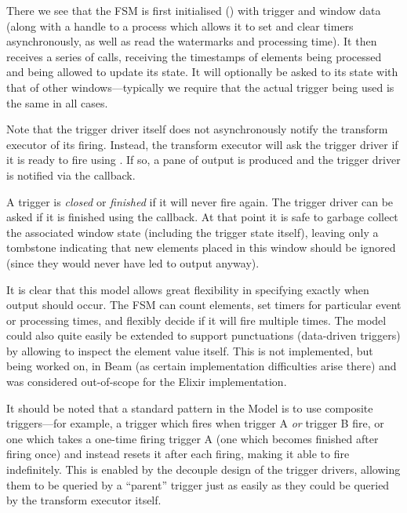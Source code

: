 
There we see that the FSM is first initialised () with trigger and window data (along with a handle to a process which allows it to set and clear timers asynchronously, as well as read the watermarks and processing time).
It then receives a series of  calls, receiving the timestamps of elements being processed and being allowed to update its state.
It will optionally be asked to  its state with that of other windows---typically we require that the actual trigger being used is the same in all cases.

Note that the trigger driver itself does not asynchronously notify the transform executor of its firing.
Instead, the transform executor will ask the trigger driver if it is ready to fire using .
If so, a pane of output is produced and the trigger driver is notified via the  callback.

A trigger is \emph{closed} or \emph{finished} if it will never fire again.
The trigger driver can be asked if it is finished using the  callback.
At that point it is safe to garbage collect the associated window state (including the trigger state itself), leaving only a tombstone indicating that new elements placed in this window should be ignored (since they would never have led to output anyway).

It is clear that this model allows great flexibility in specifying exactly when output should occur.
The FSM can count elements, set timers for particular event or processing times, and flexibly decide if it will fire multiple times.
The model could also quite easily be extended to support punctuations (data-driven triggers) by allowing  to inspect the element value itself.
This is not implemented, but being worked on, in Beam (as certain implementation difficulties arise there) and was considered out-of-scope for the Elixir implementation.

It should be noted that a standard pattern in the Model is to use composite triggers---for example, a trigger which fires when trigger A \emph{or} trigger B fire, or one which takes a one-time firing trigger A (one which becomes finished after firing once) and instead resets it after each firing, making it able to fire indefinitely.
This is enabled by the decouple design of the trigger drivers, allowing them to be queried by a ``parent'' trigger just as easily as they could be queried by the transform executor itself.

